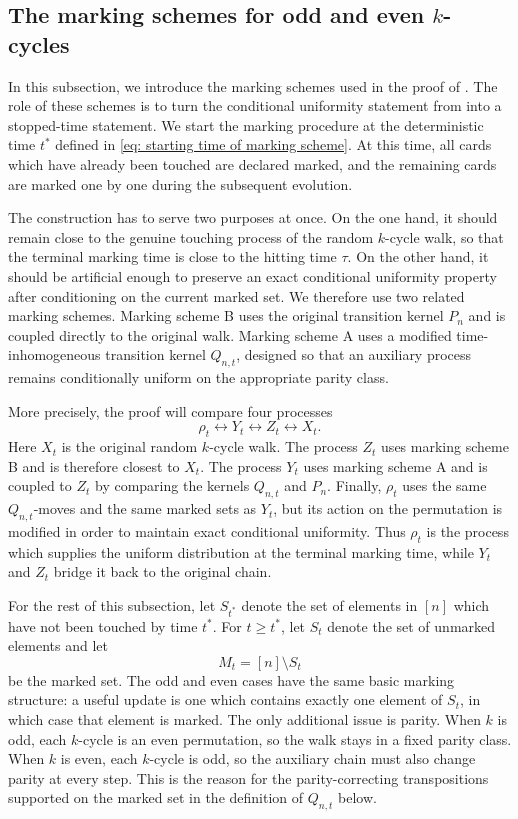 \subsection{The marking schemes for odd and even $k$-cycles}\label{subsec: marking schemes}

In this subsection, we introduce the marking schemes used in the proof of . The role of these schemes is to turn the conditional uniformity statement from  into a stopped-time statement. We start the marking procedure at the deterministic time
$t^*$ defined in \eqref{eq: starting time of marking scheme}. At this time, all cards which have already been touched are declared marked, and the remaining cards are marked one by one during the subsequent evolution.

The construction has to serve two purposes at once. On the one hand, it should remain close to the genuine touching process of the random $k$-cycle walk, so that the terminal marking time is close to the hitting time $\tau$. On the other
hand, it should be artificial enough to preserve an exact conditional uniformity property after conditioning on the current marked set. We therefore use two related marking schemes. Marking scheme B uses the original transition kernel $P_n$ and is coupled directly to the original walk. Marking scheme A uses a
modified time-inhomogeneous transition kernel $Q_{n,t}$, designed so that an auxiliary process remains conditionally uniform on the appropriate parity class.

More precisely, the proof will compare four processes
$$
\rho_t\longleftrightarrow Y_t\longleftrightarrow Z_t\longleftrightarrow X_t .
$$
Here $X_t$ is the original random $k$-cycle walk. The process $Z_t$ uses marking
scheme B and is therefore closest to $X_t$. The process $Y_t$ uses marking scheme
A and is coupled to $Z_t$ by comparing the kernels $Q_{n,t}$ and $P_n$.
Finally, $\rho_t$ uses the same $Q_{n,t}$-moves and the same marked sets as
$Y_t$, but its action on the permutation is modified in order to maintain exact
conditional uniformity. Thus $\rho_t$ is the process which supplies the uniform
distribution at the terminal marking time, while $Y_t$ and $Z_t$ bridge it back
to the original chain.

For the rest of this subsection, let $S_{t^*}$ denote the set of elements in
$[n]$ which have not been touched by time $t^*$. For $t\ge t^*$, let $S_t$
denote the set of unmarked elements and let
$$
M_t=[n]\setminus S_t
$$
be the marked set. The odd and even cases have the same basic marking structure:
a useful update is one which contains exactly one element of $S_t$, in which
case that element is marked. The only additional issue is parity. When $k$ is
odd, each $k$-cycle is an even permutation, so the walk stays in a fixed parity
class. When $k$ is even, each $k$-cycle is odd, so the auxiliary chain must also
change parity at every step. This is the reason for the parity-correcting
transpositions supported on the marked set in the definition of $Q_{n,t}$ below.

